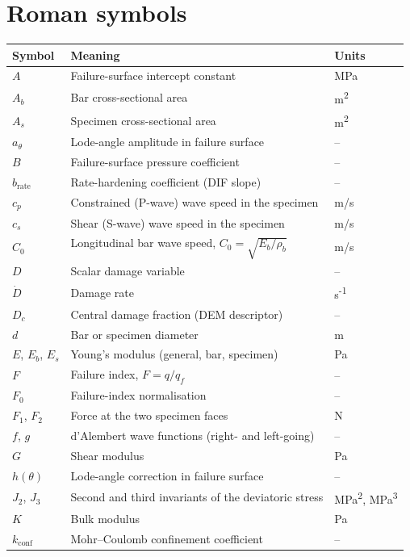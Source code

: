 \documentclass[11pt,a4paper,openany]{book}
\theoremstyle{handbook}
\newcommand{\Cz}{C_0}
\newcommand{\Ab}{A_b}
\newcommand{\As}{A_s}
\begin{document}
\section*{Roman symbols}
\begin{longtable}{@{}p{3.2cm}p{10cm}p{2cm}@{}}
\toprule
\textbf{Symbol} & \textbf{Meaning} & \textbf{Units} \\
\midrule
\endhead
$A$ & Failure-surface intercept constant & MPa \\
$\Ab$ & Bar cross-sectional area & m\textsuperscript{2} \\
$\As$ & Specimen cross-sectional area & m\textsuperscript{2} \\
$a_\theta$ & Lode-angle amplitude in failure surface & -- \\
$B$ & Failure-surface pressure coefficient & -- \\
$b_{\text{rate}}$ & Rate-hardening coefficient (DIF slope) & -- \\
$c_p$ & Constrained (P-wave) wave speed in the specimen & m/s \\
$c_s$ & Shear (S-wave) wave speed in the specimen & m/s \\
$\Cz$ & Longitudinal bar wave speed, $\Cz=\sqrt{E_b/\rho_b}$ & m/s \\
$D$ & Scalar damage variable & -- \\
$\dot D$ & Damage rate & s\textsuperscript{-1} \\
$D_c$ & Central damage fraction (DEM descriptor) & -- \\
$d$ & Bar or specimen diameter & m \\
$E$, $E_b$, $E_s$ & Young's modulus (general, bar, specimen) & Pa \\
$F$ & Failure index, $F=q/q_f$ & -- \\
$F_0$ & Failure-index normalisation & -- \\
$F_1$, $F_2$ & Force at the two specimen faces & N \\
$f$, $g$ & d'Alembert wave functions (right- and left-going) & -- \\
$G$ & Shear modulus & Pa \\
$h(\theta)$ & Lode-angle correction in failure surface & -- \\
$J_2$, $J_3$ & Second and third invariants of the deviatoric stress & MPa\textsuperscript{2}, MPa\textsuperscript{3} \\
$K$ & Bulk modulus & Pa \\
$k_{\text{conf}}$ & Mohr--Coulomb confinement coefficient & -- \\

\end{longtable}
\end{document}

